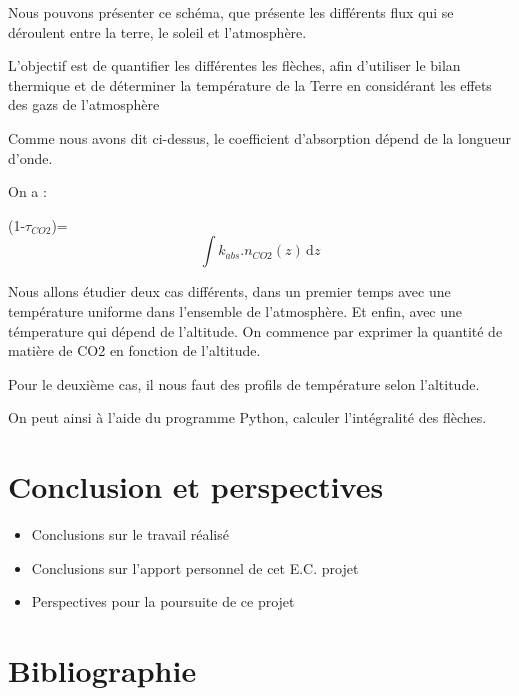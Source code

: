 \documentclass[a4paper, 12pt]{report} %
\begin{document}
Nous pouvons présenter ce schéma, que présente les différents flux qui se déroulent entre la terre, le soleil et l'atmosphère. 

L’objectif est de quantifier les différentes les flèches, afin d’utiliser le bilan thermique et de déterminer la température de la Terre en considérant les effets des gazs de l’atmosphère

Comme nous avons dit ci-dessus, le coefficient d'absorption dépend de la longueur d’onde. 

On a : 
\begin{center}
    (1-$\tau_{CO2}$)=\[ \int k_{abs}.n_{CO2}(z) \, \mathrm{d}z \]
\end{center} 

Nous allons étudier deux cas différents, dans un premier temps avec une température uniforme dans l'ensemble de l'atmosphère. Et enfin, avec une témperature qui dépend de l'altitude. On commence par exprimer la quantité de matière de CO2 en fonction de l'altitude.

Pour le deuxième cas, il nous faut des profils de température selon l'altitude.

On peut ainsi à l'aide du programme Python, calculer l'intégralité des flèches.

\chapter*{Conclusion et perspectives}
\begin{itemize}
\item Conclusions sur le travail réalisé
\item Conclusions sur l'apport personnel de cet E.C. projet
\item Perspectives pour la poursuite de ce projet
\end{itemize}


\newpage

\renewcommand{\notesname}{} %
\chapter*{Bibliographie}
\makeatletter
\renewcommand{\enoteheading}{\par\vspace{1 em}}
\renewcommand{\theenmark}{\makebox[0.5 em][r]{\@theenmark}}
\renewcommand{\enoteformat}{\parindent = 2 em
  							\leftskip = 0.5 em
  							[\theenmark]\enspace\ignorespaces}							
\makeatother
\theendnotes
\end{document}
